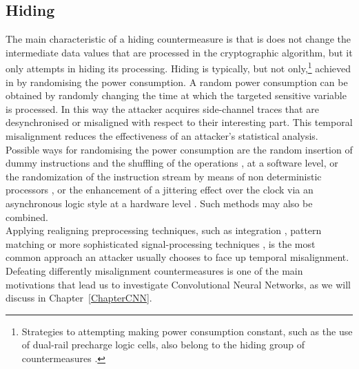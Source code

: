 \subsection{Hiding}
The main characteristic of a hiding countermeasure is that is does not change the intermediate data values that are processed in the cryptographic algorithm, but it only attempts in hiding its processing. Hiding is typically, but not only,\footnote{Strategies to attempting making power consumption constant, such as the use of dual-rail precharge logic cells, also belong to the hiding group of countermeasures \cite{popp2005masked}.} achieved in by randomising the power consumption. A random power consumption can be obtained by randomly changing the time at which the targeted sensitive variable is processed. In this way the attacker acquires side-channel traces that are desynchronised or misaligned with respect to their interesting part. This temporal misalignment reduces the effectiveness of an attacker's statistical analysis. Possible ways for randomising the power consumption are the random insertion of dummy instructions \cite{coron2009efficient,coron2010analysis} and the shuffling of the operations \cite{veyrat2012shuffling}, at a software level, or the randomization of the instruction stream by means of non deterministic processors \cite{irwin2002instruction,may2001non}, or the enhancement of a jittering effect over the clock via an asynchronous logic style at a hardware level \cite{moore2002improving,moore2003balanced}. Such methods may also be combined. \\

Applying realigning preprocessing techniques, such as integration \cite{mangard2004hardware,mangard2008power}, pattern matching \cite{nagashima2007dpa} or more sophisticated signal-processing techniques \cite{van2011improving}, is the most common approach an attacker usually chooses to face up temporal misalignment. Defeating differently misalignment countermeasures is one of the main motivations that lead us to investigate Convolutional Neural Networks, as we will discuss in Chapter~\ref{ChapterCNN}.

